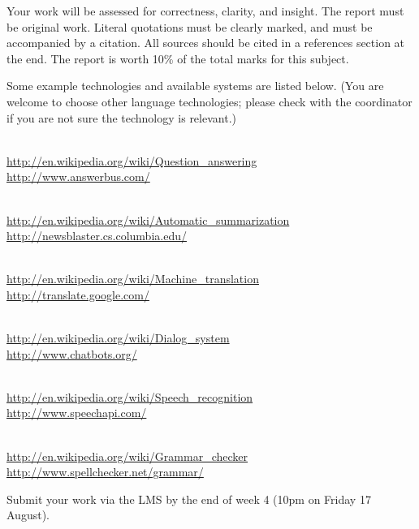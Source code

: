 \documentclass[a4paper,10pt]{article}
\begin{document}
Your work will be assessed for correctness, clarity, and insight.
The report must be original work.  Literal quotations must be clearly
marked, and must be accompanied by a citation.
All sources should be cited in a references section at the end.
The report is worth 10\% of the total marks
for this subject.

Some example technologies and available systems are listed below.
(You are welcome to choose other language technologies; please check
with the coordinator if you are not sure the technology is relevant.)
\begin{description}\setlength{\itemsep}{0pt}\setlength{\parskip}{0pt}
\item[Question answering:]\hfil\\
\url{http://en.wikipedia.org/wiki/Question_answering}\\
\url{http://www.answerbus.com/}

\item[Automatic summarization:]\hfil\\
\url{http://en.wikipedia.org/wiki/Automatic_summarization}\\
\url{http://newsblaster.cs.columbia.edu/}

\item[Machine translation:]\hfil\\
\url{http://en.wikipedia.org/wiki/Machine_translation}\\
\url{http://translate.google.com/}

\item[Dialogue systems:]\hfil\\
\url{http://en.wikipedia.org/wiki/Dialog_system}\\
\url{http://www.chatbots.org/}

\item[Speech recognition:]\hfil\\
\url{http://en.wikipedia.org/wiki/Speech_recognition}\\
\url{http://www.speechapi.com/}

\item[Grammar checker:]\hfil\\
\url{http://en.wikipedia.org/wiki/Grammar_checker}\\
\url{http://www.spellchecker.net/grammar/}

\end{description}

Submit your work via the LMS by the end of week 4 (10pm on Friday 17 August).
\end{document}
